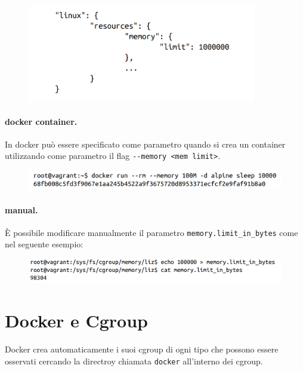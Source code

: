 \begin{figure}[H]
    \centering
    \includegraphics[width=10cm, keepaspectratio]{capitoli/os_security/imgs/limit2.png}
\end{figure}


\paragraph{docker container.} In docker può essere specificato come parametro quando
si crea un container utilizzando come parametro il flag \verb|--memory <mem limit>|.

\begin{figure}[H]
    \centering
    \includegraphics[width=\textwidth, keepaspectratio]{capitoli/os_security/imgs/limit3.png}
\end{figure}


\paragraph{manual.} È possibile modificare manualmente il parametro
\verb|memory.limit_in_bytes| come nel seguente esempio:

\begin{figure}[H]
    \centering
    \includegraphics[width=\textwidth, keepaspectratio]{capitoli/os_security/imgs/limit5.png}
\end{figure}

\section{Docker e Cgroup}

Docker crea automaticamente i suoi cgroup di ogni tipo che possono essere osservati
cercando la directroy chiamata \verb|docker| all'interno dei cgroup.


